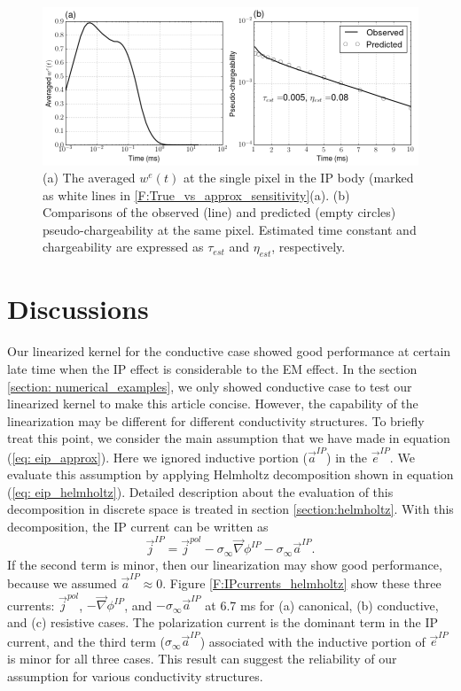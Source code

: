 \documentclass[a4paper, 11pt]{article}
\newcommand{\grad}{\vec \nabla}
\newcommand{\siginf}{\sigma_\infty}
\renewcommand {\j}  { {\vec j} }
\newcommand {\e}  { {\vec e} }
\begin{document}
\begin{figure}[htb]
  \centering
  \includegraphics[width=1.\textwidth]{figures/IntrinsicIP.png}
  \caption{(a) The averaged $w^e(t)$ at the single pixel in the IP body (marked as white lines in \ref{F:True_vs_approx_sensitivity}(a). 
  (b) Comparisons of the observed (line) and predicted (empty circles) pseudo-chargeability at the same pixel. Estimated time constant and chargeability are expressed as $\tau_{est}$ and $\eta_{est}$, respectively.}
  \label{F:IntrinsicIP}
\end{figure}
\clearpage


\section{Discussions}
Our linearized kernel for the conductive case showed good performance at certain late time when the IP effect is considerable to the EM effect. 
In the section \ref{section: numerical_examples}, we only showed conductive case to test our linearized kernel to make this article concise. 
However, the capability of the linearization may be different for different conductivity structures. 
To briefly treat this point, we consider the main assumption that we have made in equation (\ref{eq: eip_approx}). 
Here we ignored inductive portion ($\vec{a}^{IP}$) in the $\e^{IP}$. 
We evaluate this assumption by applying Helmholtz decomposition shown in equation (\ref{eq: eip_helmholtz}). 
Detailed description about the evaluation of this decomposition in discrete space is treated in section \ref{section:helmholtz}. 
With this decomposition, the IP current can be written as
\begin{equation}
  \j^{IP} = \j^{pol}-\siginf \grad \phi^{IP}-\siginf \vec{a}^{IP}.
\end{equation}
If the second term is minor, then our linearization may show good performance, because we assumed $\vec{a}^{IP}\approx 0$. 
Figure \ref{F:IPcurrents_helmholtz} show these three currents: $\j^{pol}$, $-\grad\phi^{IP}$, and $-\siginf\vec{a}^{IP}$ at 6.7 ms for (a) canonical, (b) conductive, and (c) resistive cases. 
The polarization current is the dominant term in the IP current, and the third term ($\siginf\vec{a}^{IP}$) associated with the inductive portion of $\e^{IP}$ is minor for all three cases. This result can suggest the reliability of our assumption for various conductivity structures. 
\end{document}
